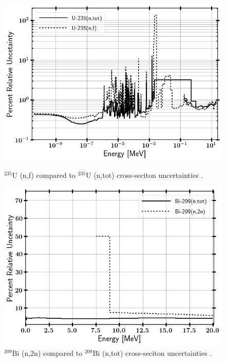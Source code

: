 \begin{figure}[!]
	\includegraphics[width=0.9\linewidth]{Figures/Chapter2/U235_RelUncert.png}
	\caption[U-235 (n,f) compared to U-235(n,tot) cross-seciton uncertainties ]{$\mathrm{^{235}U}$ (n,f) compared to $\mathrm{^{235}U}$ (n,tot) cross-seciton uncertainties \cite{ENDF}.}
	\label{fig:U235rel}
	\vskip 0.5cm
	\includegraphics[width=0.9\linewidth]{Figures/Chapter2/Bi_209_RelUncert.png}
	\caption[Bi-209 (n,2n) compared to Bi-209 (n,tot) cross-seciton uncertainties]{$\mathrm{^{209}Bi}$ (n,2n) compared to $\mathrm{^{209}Bi}$ (n,tot) cross-seciton uncertainties \cite{ENDF}.}
	\label{fig:Bi209rel}
\end{figure}

